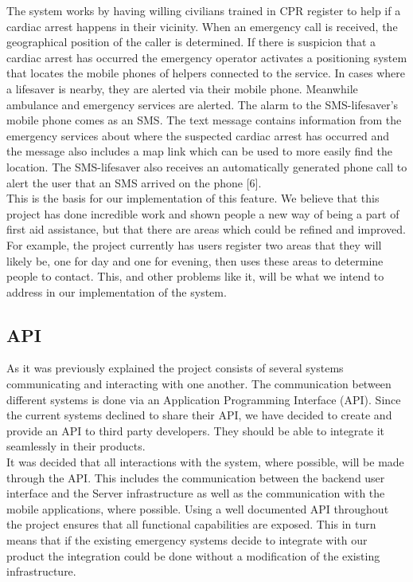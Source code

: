 \documentclass[]{article}
\begin{document}
The system works by having willing civilians trained in CPR register to help if a cardiac arrest happens in their vicinity. When an emergency call is received, the geographical position of the caller is determined. If there is suspicion that a cardiac arrest has occurred the emergency operator activates a positioning system that locates the mobile phones of helpers connected to the service. In cases where a lifesaver is nearby, they are alerted via their mobile phone. Meanwhile ambulance and emergency services are alerted. The alarm to the SMS-lifesaver’s mobile phone comes as an SMS. The text message contains information from the emergency services about where the suspected cardiac arrest has occurred and the message also includes a map link which can be used to more easily find the location. The SMS-lifesaver also receives an automatically generated phone call to alert the user that an SMS arrived on the phone [6].\\

This is the basis for our implementation of this feature. We believe that this project has done incredible work and shown people a new way of being a part of first aid assistance, but that there are areas which could be refined and improved. For example, the project currently has users register two areas that they will likely be, one for day and one for evening, then uses these areas to determine people to contact. This, and other problems like it, will be what we intend to address in our implementation of the system.\\

\pagebreak
    \subsection{API}
    As it was previously explained the project consists of several systems communicating and interacting with one another. The communication between different systems is done via an Application Programming Interface (API). Since the current systems declined to share their API, we have decided to create and provide an API to third party developers. They should be able to integrate it seamlessly in their products.\\

It was decided that all interactions with the system, where possible, will be made through the API. This includes the communication between the backend user interface and the Server infrastructure as well as the communication with the mobile applications, where possible. Using a well documented API throughout the project ensures that all functional capabilities are exposed. This in turn means that if the existing emergency systems decide to integrate with our product the integration could be done without a modification of the existing infrastructure.\\
\end{document}
